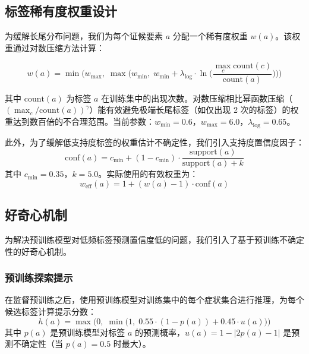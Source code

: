 \documentclass[12pt,a4paper]{article}
\begin{document}
\subsection{标签稀有度权重设计}
\label{sec:weight}

为缓解长尾分布问题，我们为每个证候要素 $a$ 分配一个稀有度权重 $w(a)$。该权重通过对数压缩方法计算：

\begin{equation}
    w(a) = \min\Big(w_{\max},\; \max\big(w_{\min},\; w_{\min} + \lambda_{\log} \cdot \ln\big(\frac{\max_c \text{count}(c)}{\text{count}(a)}\big)\big)\Big)
\end{equation}

其中 $\text{count}(a)$ 为标签 $a$ 在训练集中的出现次数。对数压缩相比幂函数压缩（$(\max_c / \text{count}(a))^\gamma$）能有效避免极端长尾标签（如仅出现 2 次的标签）的权重达到数百倍的不合理范围。当前参数：$w_{\min}=0.6$，$w_{\max}=6.0$，$\lambda_{\log}=0.65$。

此外，为了缓解低支持度标签的权重估计不确定性，我们引入支持度置信度因子：
\begin{equation}
    \text{conf}(a) = c_{\min} + (1 - c_{\min}) \cdot \frac{\text{support}(a)}{\text{support}(a) + k}
\end{equation}
其中 $c_{\min}=0.35$，$k=5.0$。实际使用的有效权重为：
\begin{equation}
    w_{\text{eff}}(a) = 1 + (w(a) - 1) \cdot \text{conf}(a)
\end{equation}

\subsection{好奇心机制}
\label{sec:curiosity}

为解决预训练模型对低频标签预测置信度低的问题，我们引入了基于预训练不确定性的好奇心机制。

\subsubsection{预训练探索提示}

在监督预训练之后，使用预训练模型对训练集中的每个症状集合进行推理，为每个候选标签计算提示分数：
\begin{equation}
    h(a) = \max\big(0,\; \min\big(1,\; 0.55 \cdot (1 - p(a)) + 0.45 \cdot u(a)\big)\big)
\end{equation}
其中 $p(a)$ 是预训练模型对标签 $a$ 的预测概率，$u(a) = 1 - |2p(a) - 1|$ 是预测不确定性（当 $p(a)=0.5$ 时最大）。
\end{document}
